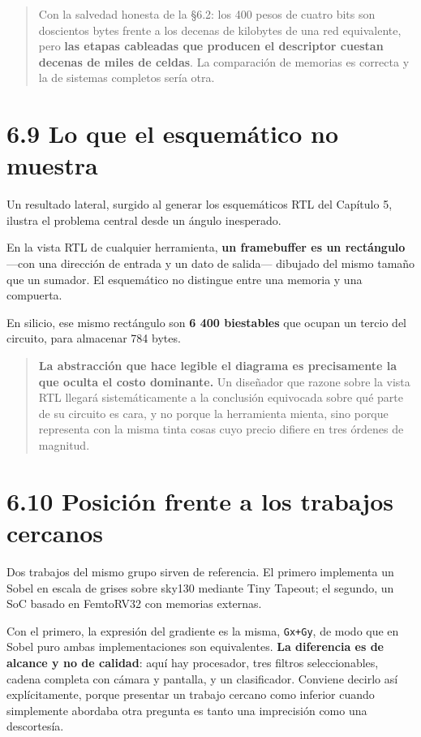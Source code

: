 \begin{quote}
Con la salvedad honesta de la §6.2: los 400 pesos de cuatro bits son
doscientos bytes frente a los decenas de kilobytes de una red
equivalente, pero \textbf{las etapas cableadas que producen el
descriptor cuestan decenas de miles de celdas}. La comparación de
memorias es correcta y la de sistemas completos sería otra.
\end{quote}

\section{6.9 Lo que el esquemático no
muestra}\label{lo-que-el-esquemuxe1tico-no-muestra}

Un resultado lateral, surgido al generar los esquemáticos RTL del
Capítulo 5, ilustra el problema central desde un ángulo inesperado.

En la vista RTL de cualquier herramienta, \textbf{un framebuffer es un
rectángulo} ---con una dirección de entrada y un dato de salida---
dibujado del mismo tamaño que un sumador. El esquemático no distingue
entre una memoria y una compuerta.

En silicio, ese mismo rectángulo son \textbf{6 400 biestables} que
ocupan un tercio del circuito, para almacenar 784 bytes.

\begin{quote}
\textbf{La abstracción que hace legible el diagrama es precisamente la
que oculta el costo dominante.} Un diseñador que razone sobre la vista
RTL llegará sistemáticamente a la conclusión equivocada sobre qué parte
de su circuito es cara, y no porque la herramienta mienta, sino porque
representa con la misma tinta cosas cuyo precio difiere en tres órdenes
de magnitud.
\end{quote}

\section{6.10 Posición frente a los trabajos
cercanos}\label{posiciuxf3n-frente-a-los-trabajos-cercanos}

Dos trabajos del mismo grupo sirven de referencia. El primero implementa
un Sobel en escala de grises sobre sky130 mediante Tiny Tapeout; el
segundo, un SoC basado en FemtoRV32 con memorias externas.

Con el primero, la expresión del gradiente es la misma,
\texttt{\textbar{}Gx\textbar{}+\textbar{}Gy\textbar{}}, de modo que en
Sobel puro ambas implementaciones son equivalentes. \textbf{La
diferencia es de alcance y no de calidad}: aquí hay procesador, tres
filtros seleccionables, cadena completa con cámara y pantalla, y un
clasificador. Conviene decirlo así explícitamente, porque presentar un
trabajo cercano como inferior cuando simplemente abordaba otra pregunta
es tanto una imprecisión como una descortesía.

